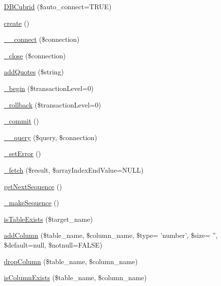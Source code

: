 \begin{DoxyCompactItemize}
\item 
\hyperlink{classDBCubrid_aa3bdbcc2f3c50b224f6e243ca0ed1d69}{D\-B\-Cubrid} (\$auto\-\_\-connect=T\-R\-U\-E)
\item 
\hyperlink{classDBCubrid_a9a5f425a0abce46d33a6d713b7dd407f}{create} ()
\item 
\hyperlink{classDBCubrid_aa0798dadf20548b2c38e925f391c72f2}{\-\_\-\-\_\-connect} (\$connection)
\item 
\hyperlink{classDBCubrid_ab1a7b718fc864d7b5992cd99abfe2690}{\-\_\-close} (\$connection)
\item 
\hyperlink{classDBCubrid_ab9aea745152a86b3852101aa3225f26d}{add\-Quotes} (\$string)
\item 
\hyperlink{classDBCubrid_a4982cdf2544caf63427258ba5d03ef83}{\-\_\-begin} (\$transaction\-Level=0)
\item 
\hyperlink{classDBCubrid_ac1173f02246bee40975fe2a96973abd0}{\-\_\-rollback} (\$transaction\-Level=0)
\item 
\hyperlink{classDBCubrid_ac8cce69fb6939b2383eb03214ff2522b}{\-\_\-commit} ()
\item 
\hyperlink{classDBCubrid_a2319e8c887147d9596e096088ff67c6a}{\-\_\-\-\_\-query} (\$query, \$connection)
\item 
\hyperlink{classDBCubrid_aaf7dd65f4cdfea9903ab641163058936}{\-\_\-set\-Error} ()
\item 
\hyperlink{classDBCubrid_abb95044521be20a8b2ba105ab623b4d9}{\-\_\-fetch} (\$result, \$array\-Index\-End\-Value=N\-U\-L\-L)
\item 
\hyperlink{classDBCubrid_a56780e480de62dfca8d67c7bccb4791c}{get\-Next\-Sequence} ()
\item 
\hyperlink{classDBCubrid_ac91bfc1859aaeb1a8d7a58e56829d4de}{\-\_\-make\-Sequence} ()
\item 
\hyperlink{classDBCubrid_aa88914b97476deb6c292a44bff2f2f40}{is\-Table\-Exists} (\$target\-\_\-name)
\item 
\hyperlink{classDBCubrid_a10207e248b4aa36b60cf4adacfb44889}{add\-Column} (\$table\-\_\-name, \$column\-\_\-name, \$type= 'number', \$size= '', \$default=null, \$notnull=F\-A\-L\-S\-E)
\item 
\hyperlink{classDBCubrid_ad0b269d73617c6de8b3135ee36ae43d2}{drop\-Column} (\$table\-\_\-name, \$column\-\_\-name)
\item 
\hyperlink{classDBCubrid_a76c8d9dd51a3e64f18b8d1f4da318ac7}{is\-Column\-Exists} (\$table\-\_\-name, \$column\-\_\-name)
\item 

\end{DoxyCompactItemize}
